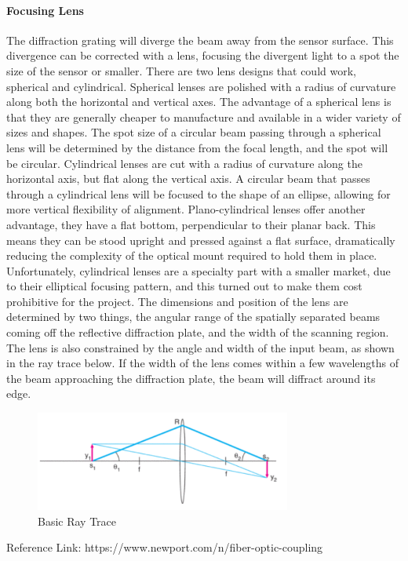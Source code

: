 \paragraph{Focusing Lens} The diffraction grating will diverge the beam away from the sensor surface. This divergence can be corrected with a lens, focusing the divergent light to a spot the size of the sensor or smaller. There are two lens designs that could work, spherical and cylindrical. Spherical lenses are polished with a radius of curvature along both the horizontal and vertical axes. The advantage of a spherical lens is that they are generally cheaper to manufacture and available in a wider variety of sizes and shapes. The spot size of a circular beam passing through a spherical lens will be determined by the distance from the focal length, and the spot will be circular. Cylindrical lenses are cut with a radius of curvature along the horizontal axis, but flat along the vertical axis. A circular beam that passes through a cylindrical lens will be focused to the shape of an ellipse, allowing for more vertical flexibility of alignment. Plano-cylindrical lenses offer another advantage, they have a flat bottom, perpendicular to their planar back. This means they can be stood upright and pressed against a flat surface, dramatically reducing the complexity of the optical mount required to hold them in place. Unfortunately, cylindrical lenses are a specialty part with a smaller market, due to their elliptical focusing pattern, and this turned out to make them cost prohibitive for the project. The dimensions and position of the lens are determined by two things, the angular range of the spatially separated beams coming off the reflective diffraction plate, and the width of the scanning region. The lens is also constrained by the angle and width of the input beam, as shown in the ray trace below. If the width of the lens comes within a few wavelengths of the beam approaching the diffraction plate, the beam will diffract around its edge.

\begin{figure}[H]
    \caption{Basic Ray Trace}
    \centering
    \includegraphics[width=0.75\textwidth]{images/BasicRayTrace.png}
\end{figure}
Reference Link: https://www.newport.com/n/fiber-optic-coupling

